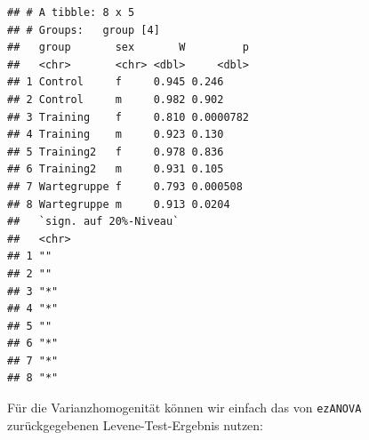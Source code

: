 \documentclass[
]{book}
\newenvironment{Shaded}{\begin{snugshade}}{\end{snugshade}}
\newcommand{\AttributeTok}[1]{\textcolor[rgb]{0.77,0.63,0.00}{#1}}
\newcommand{\NormalTok}[1]{#1}
\newcommand{\SpecialCharTok}[1]{\textcolor[rgb]{0.00,0.00,0.00}{#1}}
\newcommand{\StringTok}[1]{\textcolor[rgb]{0.31,0.60,0.02}{#1}}
\begin{document}
\begin{verbatim}
## # A tibble: 8 x 5
## # Groups:   group [4]
##   group       sex       W         p
##   <chr>       <chr> <dbl>     <dbl>
## 1 Control     f     0.945 0.246    
## 2 Control     m     0.982 0.902    
## 3 Training    f     0.810 0.0000782
## 4 Training    m     0.923 0.130    
## 5 Training2   f     0.978 0.836    
## 6 Training2   m     0.931 0.105    
## 7 Wartegruppe f     0.793 0.000508 
## 8 Wartegruppe m     0.913 0.0204   
##   `sign. auf 20%-Niveau`
##   <chr>                 
## 1 ""                    
## 2 ""                    
## 3 "*"                   
## 4 "*"                   
## 5 ""                    
## 6 "*"                   
## 7 "*"                   
## 8 "*"
\end{verbatim}

Für die Varianzhomogenität können wir einfach das von \texttt{ezANOVA} zurückgegebenen Levene-Test-Ergebnis nutzen:

\begin{Shaded}
\end{Shaded}

 
  \providecommand{\huxb}[2]{\arrayrulecolor[RGB]{#1}\global\arrayrulewidth=#2pt}
  \providecommand{\huxvb}[2]{\color[RGB]{#1}\vrule width #2pt}
  \providecommand{\huxtpad}[1]{\rule{0pt}{#1}}
  \providecommand{\huxbpad}[1]{\rule[-#1]{0pt}{#1}}
\end{document}
